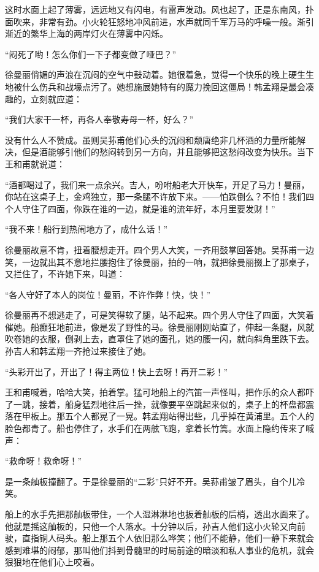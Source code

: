\par 这时水面上起了薄雾，远远地又有闪电，有雷声发动。风也起了，正是东南风，扑面吹来，非常有劲。小火轮狂怒地冲风前进，水声就同千军万马的呼噪一般。渐引渐近的繁华上海的两岸灯火在薄雾中闪烁。
\par “闷死了哟！怎么你们一下子都变做了哑巴？”
\par 徐曼丽俏媚的声浪在沉闷的空气中鼓动着。她很着急，觉得一个快乐的晚上硬生生地被什么伤兵和战壕点污了。她想施展她特有的魔力挽回这僵局！韩孟翔是最会凑趣的，立刻就应道：
\par “我们大家干一杯，再各人奉敬寿母一杯，好么？”
\par 没有什么人不赞成。虽则吴荪甫他们心头的沉闷和颓唐绝非几杯酒的力量所能解决，但是酒能够引他们的愁闷转到另一方向，并且能够把这愁闷改变为快乐。当下王和甫就说道：
\par “酒都喝过了，我们来一点余兴。吉人，吩咐船老大开快车，开足了马力！曼丽，你站在这桌子上，金鸡独立，那一条腿不许放下来。——怕跌倒么？不怕！我们四个人守住了四面，你跌在谁的一边，就是谁的流年好，本月里要发财！”
\par “我不来！船行到热闹地方了，成什么话！”
\par 徐曼丽故意不肯，扭着腰想走开。四个男人大笑，一齐用鼓掌回答她。吴荪甫一边笑，一边就出其不意地拦腰抱住了徐曼丽，拍的一响，就把徐曼丽掇上了那桌子，又拦住了，不许她下来，叫道：
\par “各人守好了本人的岗位！曼丽，不许作弊！快，快！”
\par 徐曼丽再不想逃走了，可是笑得软了腿，站不起来。四个男人守住了四面，大笑着催她。船癫狂地前进，像是发了野性的马。徐曼丽刚刚站直了，伸起一条腿，风就吹卷她的衣服，倒剥上去，直罩住了她的面孔，她的腰一闪，就向斜角里跌下去。孙吉人和韩孟翔一齐抢过来接住了她。
\par “头彩开出了，开出了！得主两位！快上去呀！再开二彩！”
\par 王和甫喊着，哈哈大笑，拍着掌。猛可地船上的汽笛一声怪叫，把作乐的众人都吓了一跳，接着，船身猛烈地往后一挫，就像要平空跳起来似的，桌子上的杯盘都震落在甲板上。那五个人都晃了一晃。韩孟翔站得出些，几乎掉在黄浦里。五个人的脸色都青了。船也停住了，水手们在两舷飞跑，拿着长竹篙。水面上隐约传来了喊声：
\par “救命呀！救命呀！”
\par 是一条舢板撞翻了。于是徐曼丽的“二彩”只好不开。吴荪甫皱了眉头，自个儿冷笑。
\par 船上的水手先把那舢板带住，一个人湿淋淋地也扳着舢板的后梢，透出水面来了。他就是摇这舢板的，只他一个人落水。十分钟以后，孙吉人他们这小火轮又向前驶，直指铜人码头。船上那五个人依旧那么哗笑；他们不能静，他们一静下来就会感到难堪的闷郁，那叫他们抖到骨髓里的时局前途的暗淡和私人事业的危机，就会狠狠地在他们心上咬着。
